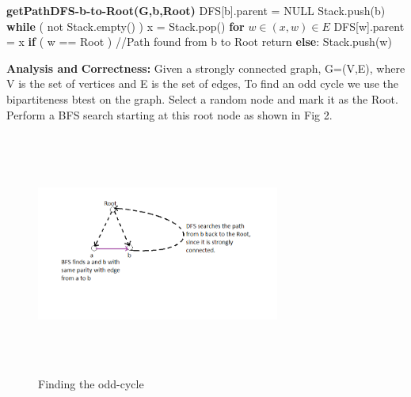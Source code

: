 \documentclass{article}
\newcommand\correctness{\vspace{.10in}\textbf{Correctness: }}
\begin{document}
  \textbf {getPathDFS-b-to-Root(G,b,Root)} \newline
  \hspace*{0.5cm} DFS[b].parent = NULL \newline
  \hspace*{0.5cm} Stack.push(b) \newline
  \hspace*{0.5cm} \textbf {while} ( not Stack.empty() ) \newline
  \hspace*{1.0cm}	x = Stack.pop() \newline	
  \hspace*{1.0cm}	\textbf {for} $w \in {(x,w) \in E}$ \newline
  \hspace*{1.5cm}		DFS[w].parent = x \newline
  \hspace*{1.5cm}		\textbf {if} ( w == Root ) \newline
  \hspace*{2.0cm}			//Path found from b to Root \newline
  \hspace*{2.0cm}			return \newline
  \hspace*{1.5cm}		\textbf {else}: \newline
  \hspace*{2.0cm}			Stack.push(w) \newline
  \newline

 \textbf {Analysis and} \correctness \newline
 Given a strongly connected graph, G=(V,E), where V is the set of vertices and E is the set of edges, To find an odd cycle we use the bipartiteness btest on the graph. Select a random node and mark it as the Root. Perform a BFS search starting at this root node as shown in Fig 2. \newline
  \begin{figure}[h!]
   \centering
  \includegraphics[width=8cm, height=8cm]{Prob4c}
  \caption{Finding the odd-cycle}
  \end{figure}
\end{document}
